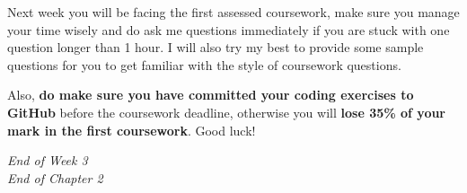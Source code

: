 \noindent Next week you will be facing the first assessed coursework, make sure you manage your time wisely and do ask me questions immediately if you are stuck with one question longer than 1 hour. I will also try my best to provide some sample questions for you to get familiar with the style of coursework questions. \medskip

\noindent Also, \textbf{do make sure you have committed your coding exercises to GitHub} before the coursework deadline, otherwise you will \textbf{lose 35\% of your mark in the first coursework}. Good luck!

\begin{center}
  \textit{\large End of Week 3}\\
  \medskip
  \textit{\large End of Chapter 2}
\end{center}
